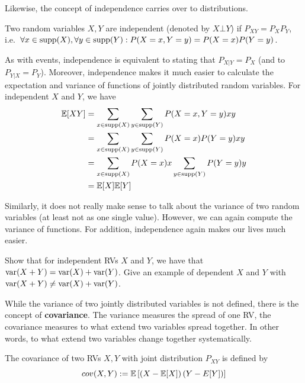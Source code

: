 Likewise, the concept of independence carries over to distributions.

\begin{Definition}
Two random variables $ X,Y $ are independent (denoted by $ X \bot Y $)
if $P_{XY} = P_X P_Y$, i.e.\ $\forall x \in \operatorname{supp}(X), \forall y \in \operatorname{supp}(Y): P(X=x, Y=y) = P(X=x)P(Y=y) $.
\end{Definition}

As with events, independence is equivalent to stating that $ P_{X|Y} = P_{X} $ (and
to $P_{Y|X}=P_Y$). Moreover, independence makes it much easier to calculate the expectation and variance of functions of jointly distributed random variables.
For independent $X$ and $Y$, we have
\begin{align}
\mathbb{E}[XY] &= \sum_{x \in \operatorname{supp}(X)} \sum_{y \in \operatorname{supp}(Y)} P(X=x,Y=y) x y \\
&= \sum_{x \in \operatorname{supp}(X)} \sum_{y \in \operatorname{supp}(Y)} P(X=x)P(Y=y) x y \\
&= \sum_{x \in \operatorname{supp}(X)} P(X=x)x \sum_{y \in \operatorname{supp}(Y)}  P(Y=y) y \\
&= \mathbb{E}[X]\mathbb{E}[Y]
\end{align}

Similarly, it does not really make sense to talk about the variance of two random variables (at least not as one single
value). However, we can again compute the variance of functions. For addition, independence again makes our lives
much easier.

\begin{Exercise}
Show that for independent RVs $X$ and $Y$, we have that $ \operatorname{var}(X + Y) =
\operatorname{var}(X) + \operatorname{var}(Y) $. Give an example of dependent $X$ and $Y$ with $ \operatorname{var}(X + Y) \neq
\operatorname{var}(X) + \operatorname{var}(Y) $.
\end{Exercise}


While the variance of two jointly distributed variables is not defined, there is the concept of \textbf{covariance}. The variance measures the spread
of one RV, the covariance measures to what extend two variables spread together. In other words, to what extend two variables change together systematically. 
\begin{Definition}[Covariance]
The covariance of two RVs $ X,Y $ with joint distribution $P_{XY}$ is defined by
$$ cov(X,Y) := \mathbb{E}\left[\left(X - \mathbb{E}[X]\right)\left(Y - E[Y]\right)\right] $$
\end{Definition}

